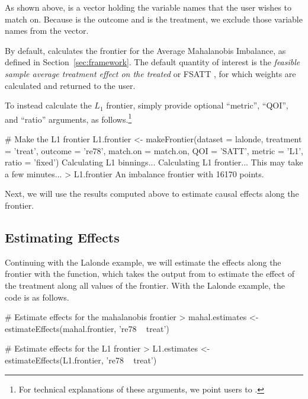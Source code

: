 \documentclass[nojss]{jss}
\begin{document}
As shown above,  is a vector holding the variable names
that the user wishes to match on. Because  is
the outcome and  is the treatment, we exclude those
variable names from the vector.

By default,  calculates the frontier for the
Average Mahalanobis Imbalance, as defined in
Section~\ref{sec:framework}.  The default quantity of interest is the
\emph{feasible sample average treatment effect on the treated} or
FSATT \citep{kingND}, for which weights are calculated and returned to the
user. 

To instead calculate the $L_1$ frontier, simply
provide optional ``metric'', ``QOI'', and ``ratio'' arguments, as
follows.\footnote{For technical explanations of these arguments, we
  point users to \citet{kingND}.}

\begin{CodeChunk}
\begin{CodeInput}
# Make the L1 frontier
L1.frontier <- makeFrontier(dataset = lalonde, 
                            treatment = 'treat', 
                            outcome = 're78', 
                            match.on = match.on,
                            QOI = 'SATT',
                            metric = 'L1',
                            ratio = 'fixed')
Calculating L1 binnings...
Calculating L1 frontier... This may take a few minutes...
> L1.frontier
An imbalance frontier with 16170 points.
\end{CodeInput}
\end{CodeChunk}

Next, we will use the results computed above to estimate causal
effects along the frontier.

\subsection{Estimating Effects}

Continuing with the Lalonde example, we will estimate the effects
along the frontier with the  function, which
takes the output from  to estimate the effect of
the treatment along all values of the frontier. With the Lalonde
example, the code is as follows.

\begin{CodeChunk}
\begin{CodeInput}
# Estimate effects for the mahalanobis frontier
> mahal.estimates <- estimateEffects(mahal.frontier, 're78 ~ treat')

# Estimate effects for the L1 frontier
> L1.estimates <- estimateEffects(L1.frontier, 're78 ~ treat')
\end{CodeInput}
\end{CodeChunk}
\end{document}
